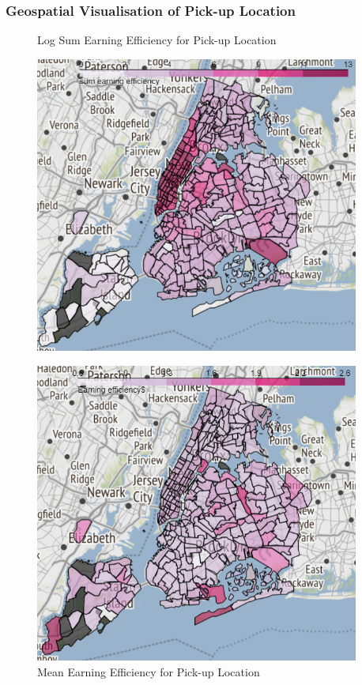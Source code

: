 \documentclass[11pt]{article}
\begin{document}
\subsubsection{Geospatial Visualisation of Pick-up Location}

\begin{figure}[h]
\begin{minipage}{.5\textwidth}
    \centering
    \caption{Log Sum Earning Efficiency for Pick-up Location}\label{f8}
    \includegraphics[width=0.95\textwidth]{geo1.jpg}
\end{minipage}
\begin{minipage}{.5\textwidth}
    \centering
    \caption{Mean Earning Efficiency for Pick-up Location} \label{f9}
    \includegraphics[width=0.95\textwidth]{geo2.jpg}
\end{minipage}
\end{figure}
\end{document}
